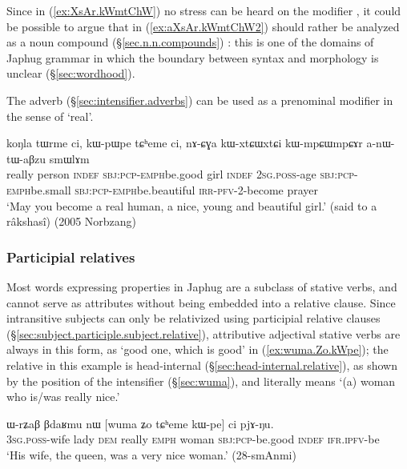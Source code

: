 Since in (\ref{ex:XsAr.kWmtChW}) no stress can be heard on the modifier , it could be possible to argue that  in  (\ref{ex:aXsAr.kWmtChW2}) should rather be analyzed as a noun compound (§\ref{sec.n.n.compounds}) : this is one of the domains of Japhug grammar in which the boundary between syntax and morphology is unclear (§\ref{sec:wordhood}).

The adverb  (§\ref{sec:intensifier.adverbs}) can be used as a prenominal modifier in the sense of `real'.

\begin{exe}
\ex \label{ex:koNla.tWrme}
\gll koŋla tɯrme ci, kɯ-pɯ\redp{}pe tɕʰeme ci,  nɤ-ɕɣa kɯ-xtɕɯ\redp{}xtɕi kɯ-mpɕɯ\redp{}mpɕɤr a-nɯ-tɯ-aβzu smɯlɤm \\
really person \textsc{indef} \textsc{sbj}:\textsc{pcp}-\textsc{emph}\redp{}be.good girl \textsc{indef} \textsc{2sg}.\textsc{poss}-age \textsc{sbj}:\textsc{pcp}-\textsc{emph}\redp{}be.small \textsc{sbj}:\textsc{pcp}-\textsc{emph}\redp{}be.beautiful \textsc{irr}-\textsc{pfv}-2-become prayer \\
\glt `May you become a real human, a nice, young and beautiful girl.' (said to a râkshasî) (2005 Norbzang)
\end{exe}

\subsubsection{Participial relatives} \label{ex:attributive.participles.stative.verbs}
Most words expressing properties in Japhug are a subclass of stative verbs, and cannot serve as attributes without being embedded into a relative clause. Since intransitive subjects can only be relativized using  participial relative clauses (§\ref{sec:subject.participle.subject.relative}), attributive adjectival stative verbs are always in this form, as  `good one, which is good' in (\ref{ex:wuma.Zo.kWpe}); the relative   in this example is head-internal (§\ref{sec:head-internal.relative}), as shown by the position of the intensifier  (§\ref{sec:wuma}), and literally means `(a) woman who is/was really nice.'

\begin{exe}
   \ex  \label{ex:wuma.Zo.kWpe}
\gll  ɯ-rʑaβ βdaʁmu nɯ [wuma ʑo tɕʰeme kɯ-pe] ci pjɤ-ŋu. \\
\textsc{3sg}.\textsc{poss}-wife lady \textsc{dem} really \textsc{emph} woman \textsc{sbj}:\textsc{pcp}-be.good \textsc{indef} \textsc{ifr}.\textsc{ipfv}-be \\
\glt `His wife, the queen, was a very nice woman.' (28-smAnmi)
\end{exe}  

